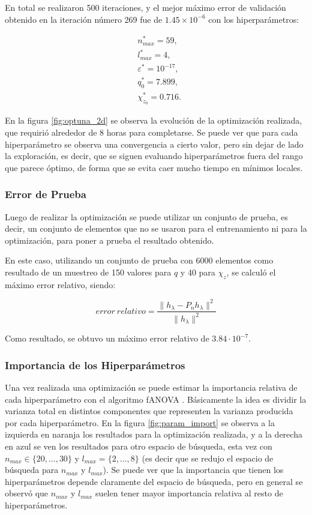 En total se realizaron 500 iteraciones, y el mejor máximo error de validación obtenido en la iteración número 269 fue de $1{.}45\times 10^{-6}$ con los hiperparámetros:

\begin{align*}
&n_{max}^* = 59, \\
 &l_{max}^* = 4, \\
&\varepsilon^* = 10^{-17},\\
 &q_0^* = 7.899, \\
 &\chi_{z_0}^* = 0.716.
\end{align*}

En la figura \ref{fig:optuna_2d} se observa la evolución de la optimización realizada, que requirió alrededor de 8 horas para completarse. Se puede ver que para cada hiperparámetro se observa una convergencia a cierto valor, pero sin dejar de lado la exploración, es decir, que se siguen evaluando hiperparámetros fuera del rango que parece óptimo, de forma que se evita caer mucho tiempo en mínimos locales.


\subsubsection*{Error de Prueba}

Luego de realizar la optimización se puede utilizar un conjunto de prueba, es decir, un conjunto de elementos que no se usaron para el entrenamiento ni para la optimización, para poner a prueba el resultado obtenido.

En este caso, utilizando un conjunto de prueba con 6000 elementos como resultado de un muestreo de 150 valores para $q$ y 40 para $\chi_z$, se calculó el máximo error relativo, siendo:

\[
error \ relativo = \frac{\| h_{\lambda} - P_n h_{\lambda} \|^2}{\| h_{\lambda} \|^2}
\]

Como resultado, se obtuvo un máximo error relativo de $3.84 \cdot 10^{-7}$.



\subsubsection{Importancia de los Hiperparámetros}

Una vez realizada una optimización se puede estimar la importancia relativa de cada hiperparámetro con el algoritmo fANOVA \cite{pmlr-v32-hutter14}. Básicamente la idea es dividir la varianza total en distintos componentes que representen la varianza producida por cada hiperparámetro. En la figura \ref{fig:param_import} se observa a la izquierda en naranja los resultados para la optimización realizada, y a la derecha en azul se ven los resultados para otro espacio de búsqueda, esta vez con $n_{max} \in \{20, ..., 30\}$  y $l_{max} = \{2, ..., 8\}$ (es decir que se redujo el espacio de búsqueda para $n_{max}$ y $l_{max}$). Se puede ver que la importancia que tienen los hiperparámetros depende claramente del espacio de búsqueda, pero en general se observó que $n_{max}$ y $l_{max}$ suelen tener mayor importancia relativa al resto de hiperparámetros.

